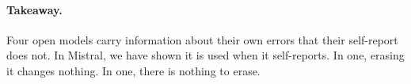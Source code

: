 \documentclass{article}
\begin{document}
\paragraph{Takeaway.}
Four open models carry information about their own errors that their self-report does not.
In Mistral, we have shown it is used when it self-reports.
In one, erasing it changes nothing.
In one, there is nothing to erase.




\appendix
{}

\end{document}
